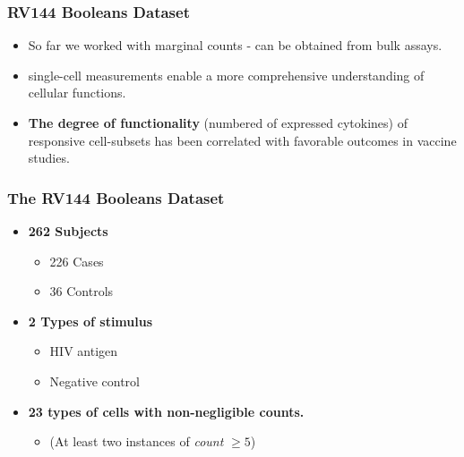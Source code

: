 \documentclass{beamer}
\theoremstyle{definition}
\begin{document}

\begin{frame}
\frametitle{RV144 Booleans Dataset}
\begin{itemize}
\item So far we worked with marginal counts - can be obtained from bulk assays. 
\pause
\vspace{0.8 cm}
\item single-cell measurements enable a more comprehensive understanding of cellular functions. 
\vspace{0.8 cm}
\item  \textbf{The degree of functionality} (numbered of expressed cytokines) of responsive cell-subsets has been correlated with favorable outcomes in vaccine studies. 
\end{itemize}
\end{frame}


\begin{frame}
\frametitle{The RV144 Booleans Dataset}
\begin{itemize}
\item \textbf{262 Subjects}
	\begin{itemize}
	\item 226 Cases
	\item 36 Controls
	\end{itemize}
\vspace{0.2 cm}
\item \textbf{2 Types of stimulus} 
	\begin{itemize}
	\item HIV antigen
	\item Negative control
	\end{itemize}
\vspace{0.2 cm}
\item \textbf{23 types of cells with non-negligible counts.} 
	\begin{itemize}
	\item (At least two instances of \emph{count} $\geq 5$)
	\end{itemize}
\end{itemize}
\end{frame}

\end{document}
